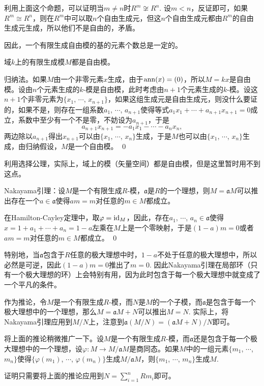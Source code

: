 利用上面这个命题，可以证明当$m\neq n$时$R^m\not\cong R^n$. 设$m<n$，反证即可，如果$R^m\cong R^n$，则在$R^m$中可以取$n$个自由生成元，但这$n$个自由生成元都由$R^m$的自由生成元生成，所以他们不是自由的，矛盾。

因此，一个有限生成自由模的基的元素个数总是一定的。

\pro 域$k$上的有限生成模$M$都是自由模。

\proof
	归纳法。如果$M$由一个非零元素$x$生成，由于$\operatorname{ann}(x)=(0)$，所以$M=kx$是自由模。设由$n$个元素生成的$k$-模是自由模，此时考虑由$n+1$个元素生成的$k$-模。设这$n+1$个非零元素为$\{x_1$, $\cdots$, $x_{n+1}\}$，如果这组生成元是自由生成元，则没什么要证的，如果不是，则存在一组系数$a_1$, $\cdots$, $a_{n+1}$使得等式$a_1x_1+\cdots+a_{n+1}x_{n+1}=0$成立，系数中至少有一个不是零，不妨设为$a_{n+1}$，于是
	\[
	a_{n+1}x_{n+1}=-a_1x_1-\cdots-a_nx_n,
	\]
	两边除以$a_{n+1}$得出$x_{n+1}$可以由$\{x_1$, $\cdots$, $x_{n}\}$生成，于是$M$也可以由$\{x_1$, $\cdots$, $x_{n}\}$生成，由归纳假设，$M$是一个自由模。
\qed

利用选择公理，实际上，域上的模（矢量空间）都是自由模，但是这里暂时用不到这点。

\theo Nakayama引理：设$M$是一个有限生成$R$-模，$\mathfrak{a}$是$R$的一个理想，则$M=\mathfrak{a}M$可以推出存在一个$a\in \mathfrak{a}$使得$am=m$对任意的$m\in M$都成立。

\proof
	在Hamilton-Cayley定理中，取$\varphi=\operatorname{id}_M$，因此，存在$a_1$, $\cdots$, $a_n\in \mathfrak{a}$使得$x=1+a_1+\cdots+a_n=1-a$左乘在$M$上是一个零映射，于是$(1-a)m=0$或者$am=m$对任意的$m\in M$都成立。
\qed

特别地，当$\mathfrak{a}$包含于$R$任意的极大理想中时，$1-a$不处于任意的极大理想中，所以必然是可逆，因此$(1-a)m=0$推出了$m=0$. 因此Nakayama引理在局部环（只有一个极大理想的环）上会特别有用，因为此时包含于每一个极大理想中就变成了一个平凡的条件。

作为推论，令$M$是一个有限生成$R$-模，而$N$是$M$的一个子模，而$\mathfrak{a}$是包含于每一个极大理想中的一个理想，那么$M=\mathfrak{a}M+N$可以推出$M=N$. 实际上，将Nakayama引理应用到$M/N$上，注意到$\mathfrak{a}(M/N)=(\mathfrak{a}M+N)/N$即可。

\pro 将上面的推论稍微推广一下。设$M$是一个有限生成$R$-模，而$\mathfrak{a}$还是包含于每一个极大理想中的一个理想，设$\varphi:M\to M/\mathfrak{a}M$是商同态。如果$M$中的一组元素$\{m_1$, $\cdots$, $m_n\}$使得$\{\varphi(m_1)$, $\cdots$, $\varphi(m_n)\}$生成$M/\mathfrak{a}M$，则$\{m_1$, $\cdots$, $m_n\}$生成$M$.

证明只需要将上面的推论应用到$N=\sum_{i=1}^n Rm_i$即可。

